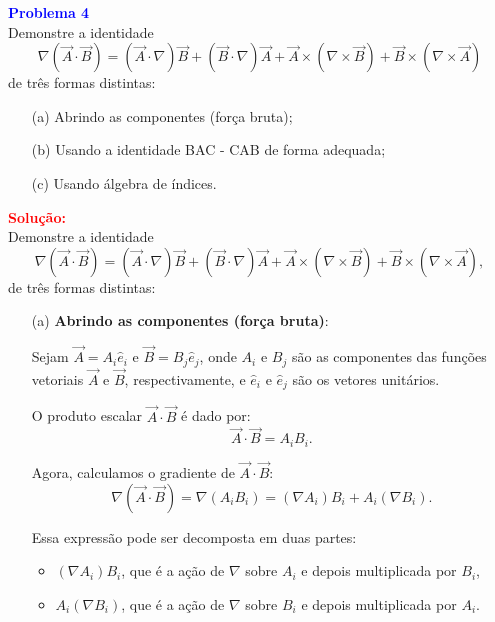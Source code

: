 \documentclass[a4paper,12pt]{article}
\begin{document}
\begin{flushleft}
\textbf{\textcolor{blue}{Problema 4}}\\
Demonstre a identidade
\begin{equation}
\nabla (\vec{A} \cdot \vec{B}) = (\vec{A} \cdot \nabla) \vec{B} + (\vec{B} \cdot \nabla) \vec{A} + \vec{A} \times (\nabla \times \vec{B}) + \vec{B} \times (\nabla \times \vec{A})
\end{equation}
de três formas distintas:
\begin{itemize}
    \item[(a)] Abrindo as componentes (força bruta);
    \item[(b)] Usando a identidade BAC - CAB de forma adequada;
    \item[(c)] Usando álgebra de índices.
\end{itemize}

\textcolor{red}{\textbf{Solução:}}\\
Demonstre a identidade
\begin{equation}
    \nabla (\vec{A} \cdot \vec{B}) = (\vec{A} \cdot \nabla) \vec{B} + (\vec{B} \cdot \nabla) \vec{A} + \vec{A} \times (\nabla \times \vec{B}) + \vec{B} \times (\nabla \times \vec{A}),
    \end{equation}
    de três formas distintas:
    
    \begin{itemize}
        \item[(a)] \textbf{Abrindo as componentes (força bruta)}:
        
        Sejam \( \vec{A} = A_i \hat{e}_i \) e \( \vec{B} = B_j \hat{e}_j \), onde \( A_i \) e \( B_j \) são as componentes das funções vetoriais \( \vec{A} \) e \( \vec{B} \), respectivamente, e \( \hat{e}_i \) e \( \hat{e}_j \) são os vetores unitários.
        
        O produto escalar \( \vec{A} \cdot \vec{B} \) é dado por:
        \begin{equation}
        \vec{A} \cdot \vec{B} = A_i B_i.
        \end{equation}
        
        Agora, calculamos o gradiente de \( \vec{A} \cdot \vec{B} \):
        \begin{equation}
        \nabla (\vec{A} \cdot \vec{B}) = \nabla (A_i B_i) = (\nabla A_i) B_i + A_i (\nabla B_i).
        \end{equation}
        
        Essa expressão pode ser decomposta em duas partes:
        \begin{itemize}
            \item \( (\nabla A_i) B_i \), que é a ação de \( \nabla \) sobre \( A_i \) e depois multiplicada por \( B_i \),
            \item \( A_i (\nabla B_i) \), que é a ação de \( \nabla \) sobre \( B_i \) e depois multiplicada por \( A_i \).
        \end{itemize}
        

\end{itemize}
\end{flushleft}
\end{document}
